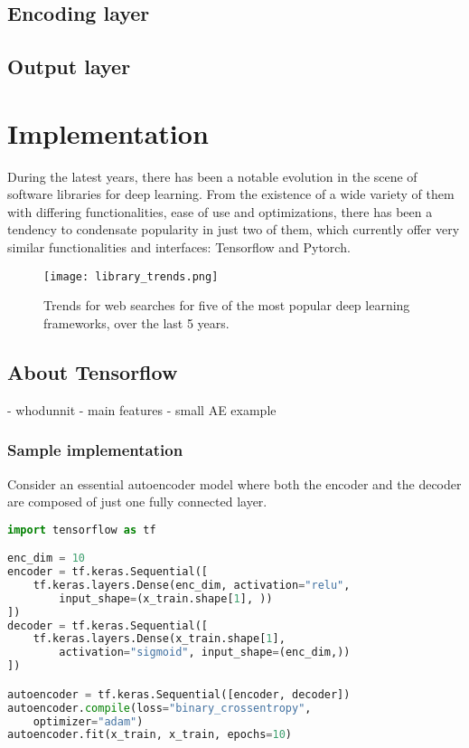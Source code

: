 \subsection{Encoding layer}

\subsection{Output layer}


\section{Implementation}

During the latest years, there has been a notable evolution in the scene of software libraries for deep learning. From the existence of a wide variety of them with differing functionalities, ease of use and optimizations, there has been a tendency to condensate popularity in just two of them, which currently offer very similar functionalities and interfaces: Tensorflow and Pytorch.

\begin{figure*}[htbp]
    \centering  
    \texttt{[image: library\_trends.png]}
    \caption{Trends for web searches for five of the most popular deep learning frameworks, over the last 5 years.}
    \label{fig:trends}
\end{figure*}

\subsection{About Tensorflow}

- whodunnit
- main features
- small AE example

\subsubsection{Sample implementation}

Consider an essential autoencoder model where both the encoder and the decoder are composed of just one fully connected layer. 

\begin{lstlisting}[language=Python]
import tensorflow as tf

enc_dim = 10
encoder = tf.keras.Sequential([
    tf.keras.layers.Dense(enc_dim, activation="relu", 
        input_shape=(x_train.shape[1], ))
])
decoder = tf.keras.Sequential([
    tf.keras.layers.Dense(x_train.shape[1], 
        activation="sigmoid", input_shape=(enc_dim,))
])

autoencoder = tf.keras.Sequential([encoder, decoder])
autoencoder.compile(loss="binary_crossentropy", 
    optimizer="adam")
autoencoder.fit(x_train, x_train, epochs=10)
\end{lstlisting}

